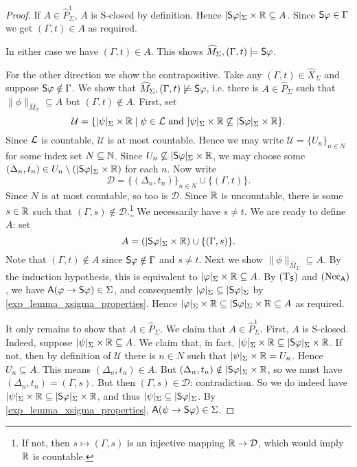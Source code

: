 \begin{proof}
    If $A \in \widehat{P}_\Sigma^1$, $A$ is S-closed by definition.  Hence
    $|\S\phi|_\Sigma \times \R \subseteq A$. Since $\S\phi \in \Gamma$ we get
    $(\Gamma, t) \in A$ as required.

    In either case we have $(\Gamma, t) \in A$. This shows $\widehat{M}_\Sigma,
    (\Gamma, t) \models \S\phi$.

    For the other direction we show the contrapositive. Take any $(\Gamma, t)
    \in \widehat{X}_\Sigma$ and suppose $\S\phi \notin \Gamma$. We show that
    $\widehat{M}_\Sigma, (\Gamma, t) \not\models \S\phi$, i.e. there is $A \in
    \widehat{P}_\Sigma$ such that $\|\phi\|_{\widehat{M}_\Sigma} \subseteq A$
    but $(\Gamma, t) \notin A$.
    First, set
    \[
        \mathcal{U} = \{
        |\psi|_\Sigma \times \R
        \mid
        \psi \in \cL \text{ and }
        |\psi|_\Sigma \times \R \not\subseteq |\S\phi|_\Sigma \times \R
        \}.
    \]
    Since $\cL$ is countable, $\mathcal{U}$ is at most countable.
    Hence we may write $\mathcal{U} = \{U_n\}_{n \in N}$ for some
    index set $N \subseteq \N$. Since $U_n \not\subseteq
    |\S\phi|_\Sigma \times \R$, we may choose some $(\Delta_n, t_n)
    \in U_n \setminus (|\S\phi|_\Sigma \times \R)$ for each $n$. Now
    write
    \[
      \mathcal{D} = \{(\Delta_n, t_n)\}_{n \in N} \cup \{(\Gamma,
      t)\}.
    \]
    Since $N$ is at most countable, so too is $\mathcal{D}$.  Since
    $\R$ is uncountable, there is some $s \in \R$ such that $(\Gamma,
    s) \notin \mathcal{D}$.\footnote{If not, then $s \mapsto
    (\Gamma, s)$ is an injective mapping $\R \to \mathcal{D}$, which
    would imply $\R$ is countable.} We necessarily have $s \ne t$. We
    are ready to define $A$: set
    \[
      A = (|\S\phi|_\Sigma \times \R) \cup \{(\Gamma, s)\}.
    \]
    Note that $(\Gamma, t) \notin A$ since $\S\phi \notin \Gamma$ and
    $s \ne t$.
    Next we show $\|\phi\|_{\widehat{M}_\Sigma} \subseteq A$. By the
    induction hypothesis, this is equivalent to $|\phi|_\Sigma \times
    \R \subseteq A$. By $\Tsoundness$ and $\necuniv$, we have
    $\A(\phi \limplies \S\phi) \in \Sigma$, and consequently
    $|\phi|_\Sigma \subseteq |\S\phi|_\Sigma$ by
    \cref{exp_lemma_xsigma_properties}. Hence $|\phi|_\Sigma \times \R
    \subseteq |\S\phi|_\Sigma \times \R \subseteq A$ as required.

    It only remains to show that $A \in \widehat{P}_\Sigma$. We claim
    that $A \in \widehat{P}_\Sigma^1$. First, $A$ is S-closed.
    Indeed, suppose $|\psi|_\Sigma \times \R \subseteq A$. We claim
    that, in fact, $|\psi|_\Sigma \times \R \subseteq |\S\phi|_\Sigma
    \times \R$. If not, then by definition of $\mathcal{U}$ there is
    $n \in N$ such that $|\psi|_\Sigma \times \R = U_n$.  Hence $U_n
    \subseteq A$. This means $(\Delta_n, t_n) \in A$. But
    $(\Delta_n, t_n) \notin |\S\phi|_\Sigma \times \R$, so we must
    have $(\Delta_n, t_n) = (\Gamma, s)$. But then $(\Gamma, s) \in
    \mathcal{D}$: contradiction. So we do indeed have $|\psi|_\Sigma
    \times \R \subseteq |\S\phi|_\Sigma \times \R$, and thus
    $|\psi|_\Sigma \subseteq |\S\phi|_\Sigma$. By
    \cref{exp_lemma_xsigma_properties}, $\A(\psi \limplies \S\phi) \in
    \Sigma$.


\end{proof}

